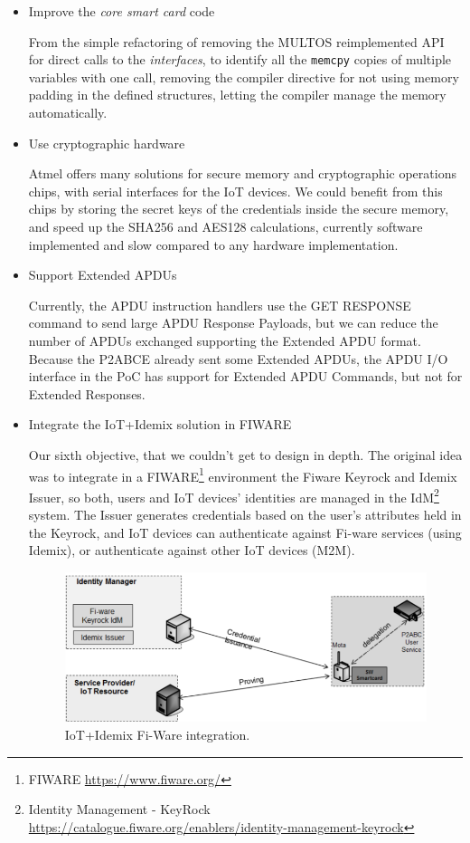 \documentclass[journal]{IEEEtran}
\begin{document}
\begin{itemize}
	\item Improve the \textit{core smart card} code
	
	From the simple refactoring of removing the MULTOS reimplemented API for direct calls to the \textit{interfaces}, to identify all the \texttt{memcpy} copies of multiple variables with one call, removing the compiler directive for not using memory padding in the defined structures, letting the compiler manage the memory automatically.
	
	
	\item Use cryptographic hardware
	
	Atmel offers many solutions for secure memory and cryptographic operations chips, with serial interfaces for the IoT devices. We could benefit from this chips by storing the secret keys of the credentials inside the secure memory, and speed up the SHA256 and AES128 calculations, currently software implemented and slow compared to any hardware implementation. 
	
	
	
	\item Support Extended APDUs
	
	Currently, the APDU instruction handlers use the GET RESPONSE command to send large APDU Response Payloads, but we can reduce the number of APDUs exchanged supporting the Extended APDU format. Because the P2ABCE already sent some Extended APDUs, the APDU I/O interface in the PoC has support for Extended APDU Commands, but not for Extended Responses.
	
	\item Integrate the IoT+Idemix solution in FIWARE
	
	Our sixth objective, that we couldn't get to design in depth. The original idea was to integrate in a FIWARE\footnote{FIWARE \url{https://www.fiware.org/}} environment the Fiware Keyrock and Idemix Issuer, so both, users and IoT devices' identities are managed in the IdM\footnote{Identity Management - KeyRock \url{https://catalogue.fiware.org/enablers/identity-management-keyrock}} system. The Issuer generates credentials based on the user’s attributes held in the Keyrock, and IoT devices can authenticate against Fi-ware services (using Idemix), or authenticate against other IoT devices (M2M).
	
	\begin{figure}[bth]
		\begin{center}
			\includegraphics[width=0.8\linewidth]{gfx/fiware}
		\end{center}
		\caption{IoT+Idemix Fi-Ware integration.}
		\label{fig:fiware}
	\end{figure}
	

\end{itemize}
\end{document}
